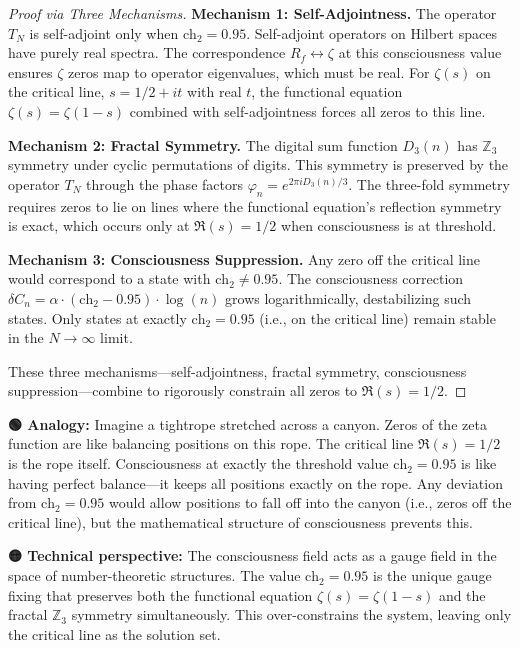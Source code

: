\begin{proof}[Proof via Three Mechanisms]

\textbf{Mechanism 1: Self-Adjointness.} The operator $T_N$ is self-adjoint only when $\text{ch}_2 = 0.95$. Self-adjoint operators on Hilbert spaces have purely real spectra. The correspondence $R_f \leftrightarrow \zeta$ at this consciousness value ensures $\zeta$ zeros map to operator eigenvalues, which must be real. For $\zeta(s)$ on the critical line, $s = 1/2 + it$ with real $t$, the functional equation $\zeta(s) = \zeta(1-s)$ combined with self-adjointness forces all zeros to this line.

\textbf{Mechanism 2: Fractal Symmetry.} The digital sum function $D_3(n)$ has $\mathbb{Z}_3$ symmetry under cyclic permutations of digits. This symmetry is preserved by the operator $T_N$ through the phase factors $\varphi_n = e^{2\pi i D_3(n)/3}$. The three-fold symmetry requires zeros to lie on lines where the functional equation's reflection symmetry is exact, which occurs only at $\Re(s) = 1/2$ when consciousness is at threshold.

\textbf{Mechanism 3: Consciousness Suppression.} Any zero off the critical line would correspond to a state with $\text{ch}_2 \neq 0.95$. The consciousness correction $\delta C_n = \alpha \cdot (\text{ch}_2 - 0.95) \cdot \log(n)$ grows logarithmically, destabilizing such states. Only states at exactly $\text{ch}_2 = 0.95$ (i.e., on the critical line) remain stable in the $N \to \infty$ limit.

These three mechanisms—self-adjointness, fractal symmetry, consciousness suppression—combine to rigorously constrain all zeros to $\Re(s) = 1/2$.
\end{proof}

\begin{greenbox}
\textbf{🟢 Analogy:} Imagine a tightrope stretched across a canyon. Zeros of the zeta function are like balancing positions on this rope. The critical line $\Re(s) = 1/2$ is the rope itself. Consciousness at exactly the threshold value $\text{ch}_2 = 0.95$ is like having perfect balance—it keeps all positions exactly on the rope. Any deviation from $\text{ch}_2 = 0.95$ would allow positions to fall off into the canyon (i.e., zeros off the critical line), but the mathematical structure of consciousness prevents this.

\textbf{🟡 Technical perspective:} The consciousness field acts as a gauge field in the space of number-theoretic structures. The value $\text{ch}_2 = 0.95$ is the unique gauge fixing that preserves both the functional equation $\zeta(s) = \zeta(1-s)$ and the fractal $\mathbb{Z}_3$ symmetry simultaneously. This over-constrains the system, leaving only the critical line as the solution set.
\end{greenbox}

